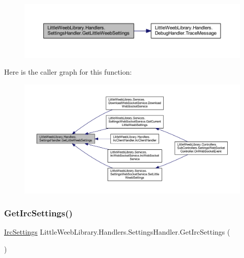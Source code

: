 \begin{figure}[H]
\begin{center}
\leavevmode
\includegraphics[width=350pt]{class_little_weeb_library_1_1_handlers_1_1_settings_handler_a53a5c5206eb6d2c58fa9d970c9b97463_cgraph}
\end{center}
\end{figure}
Here is the caller graph for this function\+:\nopagebreak
\begin{figure}[H]
\begin{center}
\leavevmode
\includegraphics[width=350pt]{class_little_weeb_library_1_1_handlers_1_1_settings_handler_a53a5c5206eb6d2c58fa9d970c9b97463_icgraph}
\end{center}
\end{figure}
\mbox{\label{class_little_weeb_library_1_1_handlers_1_1_settings_handler_a22195b5d1df129295e0e30298611bdba}} 
\subsubsection{\texorpdfstring{Get\+Irc\+Settings()}{GetIrcSettings()}}
{\footnotesize\ttfamily \mbox{\hyperlink{class_little_weeb_library_1_1_settings_1_1_irc_settings}{Irc\+Settings}} Little\+Weeb\+Library.\+Handlers.\+Settings\+Handler.\+Get\+Irc\+Settings (\begin{DoxyParamCaption}{ }\end{DoxyParamCaption})}



